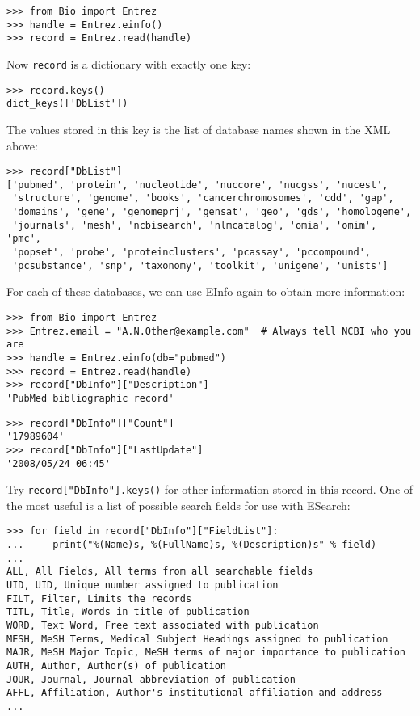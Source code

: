 \begin{verbatim}
>>> from Bio import Entrez
>>> handle = Entrez.einfo()
>>> record = Entrez.read(handle)
\end{verbatim}
Now \verb+record+ is a dictionary with exactly one key:
\begin{verbatim}
>>> record.keys()
dict_keys(['DbList'])
\end{verbatim}
The values stored in this key is the list of database names shown in the XML above:
\begin{verbatim}
>>> record["DbList"]
['pubmed', 'protein', 'nucleotide', 'nuccore', 'nucgss', 'nucest',
 'structure', 'genome', 'books', 'cancerchromosomes', 'cdd', 'gap',
 'domains', 'gene', 'genomeprj', 'gensat', 'geo', 'gds', 'homologene',
 'journals', 'mesh', 'ncbisearch', 'nlmcatalog', 'omia', 'omim', 'pmc',
 'popset', 'probe', 'proteinclusters', 'pcassay', 'pccompound',
 'pcsubstance', 'snp', 'taxonomy', 'toolkit', 'unigene', 'unists']
\end{verbatim}

For each of these databases, we can use EInfo again to obtain more information:

\begin{verbatim}
>>> from Bio import Entrez
>>> Entrez.email = "A.N.Other@example.com"  # Always tell NCBI who you are
>>> handle = Entrez.einfo(db="pubmed")
>>> record = Entrez.read(handle)
>>> record["DbInfo"]["Description"]
'PubMed bibliographic record'
\end{verbatim}
\begin{verbatim}
>>> record["DbInfo"]["Count"]
'17989604'
>>> record["DbInfo"]["LastUpdate"]
'2008/05/24 06:45'
\end{verbatim}
Try \verb+record["DbInfo"].keys()+ for other information stored in this record.
One of the most useful is a list of possible search fields for use with ESearch:

\begin{verbatim}
>>> for field in record["DbInfo"]["FieldList"]:
...     print("%(Name)s, %(FullName)s, %(Description)s" % field)
...
ALL, All Fields, All terms from all searchable fields
UID, UID, Unique number assigned to publication
FILT, Filter, Limits the records
TITL, Title, Words in title of publication
WORD, Text Word, Free text associated with publication
MESH, MeSH Terms, Medical Subject Headings assigned to publication
MAJR, MeSH Major Topic, MeSH terms of major importance to publication
AUTH, Author, Author(s) of publication
JOUR, Journal, Journal abbreviation of publication
AFFL, Affiliation, Author's institutional affiliation and address
...
\end{verbatim}

